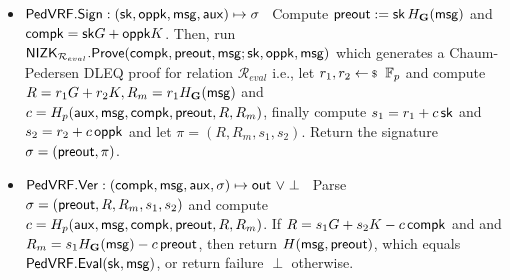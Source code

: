 \begin{itemize}
	\item ${\mathsf{PedVRF}}.{\mathsf{Sign}} : (\mathsf{sk},\mathsf{oppk},\mathsf{msg},\mathsf{aux}) \mapsto \sigma$ \,
	Compute ${\mathsf{preout}} := \mathsf{sk} \, H_{{\mathbf{G}}}(\mathsf{msg})$ and $ \mathsf{compk} = \mathsf{sk} G + \mathsf{oppk}K $. Then, run ${\mathsf{NIZK}}_{\mathcal{R}_{eval}}.{\mathsf{Prove}}(\mathsf{compk}, {\mathsf{preout}}, \mathsf{msg};\mathsf{sk},\mathsf{oppk},\mathsf{msg})  $ which generates a Chaum-Pedersen DLEQ proof
	for relation $\mathcal{R}_{eval}$ i.e.,
	let $r_1,r_2 \leftsample \F_p$
	and compute $R = r_1 G + r_2 K, R_m = r_1 H_{{\mathbf{G}}}(\mathsf{msg}) $ and $c = H_p(\mathsf{aux},\mathsf{msg},\mathsf{compk},{\mathsf{preout}},R,R_m)$, finally compute $s_1 = r_1 + c \, \mathsf{sk}$ and $s_2 = r_2 + c \, \mathsf{oppk}$ and let $ \pi = (R,R_m,s_1,s_2) $.
	Return the signature $\sigma = ({\mathsf{preout}},\pi) $.
	
	\item ${\mathsf{PedVRF}}.{\mathsf{Ver}} : (\mathsf{compk},\mathsf{msg},\mathsf{aux},\sigma) \mapsto {\ensuremath{\mathsf{out}}} \,\, \lor \perp$ \,
	Parse $\sigma = ({\mathsf{preout}}, R,R_m,s_1,s_2) $ and compute 
	$c = H_p(\mathsf{aux},\mathsf{msg},\mathsf{compk},{\mathsf{preout}},R,R_m)$.
	If $ R = s_1 G + s_2 K - c \, \mathsf{compk}$ and
	and $ R_m = s_1 H_{{\mathbf{G}}}(\mathsf{msg}) - c \, {\mathsf{preout}}$,
	then return $H(\mathsf{msg},{\mathsf{preout}})$, which equals ${\mathsf{PedVRF}}.{\mathsf{Eval}}(\mathsf{sk},\mathsf{msg})$,
	or return failure $\perp$ otherwise.
\end{itemize}





